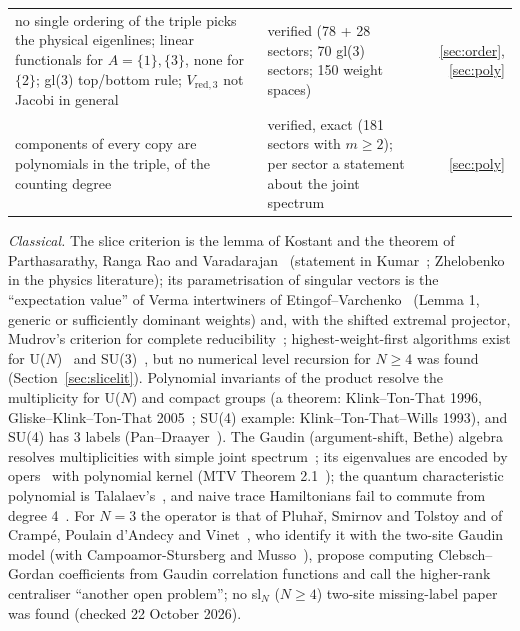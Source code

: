 \documentclass[11pt]{article}
\makeatletter
\renewcommand\subsection{\@startsection{subsection}{2}{\z@}{-2.0ex \@plus -1ex \@minus -.2ex}{0.6ex \@plus .2ex}{\normalfont\normalsize\bfseries}}
\makeatother
\begin{document}
\begin{table}[htbp]
\begin{tabular}{@{}>{\raggedright\arraybackslash}p{}>{\raggedright\arraybackslash}p{}r@{}}
no single ordering of the triple picks the physical eigenlines; linear functionals for $A=\{1\},\{3\}$, none for $\{2\}$; gl(3) top/bottom rule; $V_{\mathrm{red},3}$ not Jacobi in general & verified (78 + 28 sectors; 70 gl(3) sectors; 150 weight spaces) & \ref{sec:order}, \ref{sec:poly} \\
components of every copy are polynomials in the triple, of the counting degree & verified, exact (181 sectors with $m\ge2$); per sector a statement about the joint spectrum & \ref{sec:poly} \\
\bottomrule
\end{tabular}
\end{table}

\subsection{Classical and new}\label{sec:classnew}

\emph{Classical.}
The slice criterion is the lemma of Kostant and the theorem of Parthasarathy, Ranga Rao and Varadarajan~\cite{kostant,prv} (statement in Kumar~\cite{kumar}; Zhelobenko~\cite{zhel} in the physics literature); its parametrisation of singular vectors is the ``expectation value'' of Verma intertwiners of Etingof--Varchenko~\cite{ev} (Lemma 1, generic or sufficiently dominant weights) and, with the shifted extremal projector, Mudrov's criterion for complete reducibility~\cite{mudrov}; highest-weight-first algorithms exist for U($N$)~\cite{gkt,rr,dang,pd} and SU(3)~\cite{ast,da,herko}, but no numerical level recursion for $N\ge4$ was found (Section~\ref{sec:slicelit}).
Polynomial invariants of the product resolve the multiplicity for U($N$) and compact groups (a theorem: Klink--Ton-That 1996, Gliske--Klink--Ton-That 2005~\cite{klink,gkt}; SU(4) example: Klink--Ton-That--Wills 1993), and SU(4) has 3 labels (Pan--Draayer~\cite{pd}).
The Gaudin (argument-shift, Bethe) algebra resolves multiplicities with simple joint spectrum~\cite{vinberg,rybnikov,ffr,mtv,hkrw}; its eigenvalues are encoded by opers~\cite{ffres,frenkel} with polynomial kernel (MTV Theorem 2.1~\cite{mtvglasgow}); the quantum characteristic polynomial is Talalaev's~\cite{talalaev,chervov}, and naive trace Hamiltonians fail to commute from degree 4~\cite{crt,talalaev}.
For $N=3$ the operator is that of Pluha\v{r}, Smirnov and Tolstoy and of Cramp\'e, Poulain d'Andecy and Vinet~\cite{psv,cpv}, who identify it with the two-site Gaudin model (with Campoamor-Stursberg and Musso~\cite{csm}), propose computing Clebsch--Gordan coefficients from Gaudin correlation functions and call the higher-rank centraliser ``another open problem''; no sl$_N$ ($N\ge4$) two-site missing-label paper was found (checked 22 October 2026).
\end{document}
